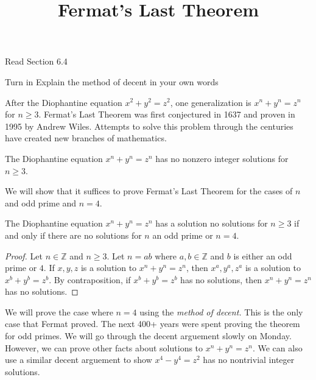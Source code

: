 \documentclass{ximera}
\title{Fermat's Last Theorem}
\begin{document}
\begin{abstract}
\end{abstract}
\maketitle

\begin{pre}
    \item[Read] Section 6.4

	\item[Turn in] Explain the method of decent in your own words
\end{pre}


After the Diophantine equation $x^2+y^2=z^2$, one generalization is $x^n+y^n=z^n$ for $n\geq 3$. Fermat's Last Theorem was first conjectured in 1637 and proven in 1995 by Andrew Wiles. Attempts to solve this problem through the centuries have created new branches of mathematics.
 
\begin{theorem}\label{fermat-last}
The Diophantine equation $x^n+y^n=z^n$ has no nonzero integer solutions for $n\geq3$.
\end{theorem}
 
We will show that it suffices to prove Fermat's Last Theorem for the cases of $n$ and odd prime and $n=4$.
\begin{theorem}\label{thm:reduce-sol-fermat}
	The Diophantine equation $x^n+y^n=z^n$ has a solution no solutions for $n\geq 3$ if and only if there are no solutions for $n$ an odd prime or $n=4$.

\begin{proof}
 	Let $n\in\mathbb{Z}$ and $n\geq 3$. Let $n=ab$ where $a,b\in\mathbb{Z}$ and $b$ is either an odd prime or $4$. If $x,y,z$ is a solution to $x^n+y^n=z^n$, then $x^a,y^a,z^a$ is a solution to $x^b+y^b=z^b$. By contraposition, if $x^b+y^b=z^b$ has no solutions, then $x^n+y^n=z^n$ has no solutions.
\end{proof}
\end{theorem}




We will prove the case where $n=4$ using the \emph{method of decent.} This is the only case that Fermat proved. The next 400+ years were spent proving the theorem for odd primes. We will go through the decent arguement slowly on Monday. However, we can prove other facts about solutions to $x^n+y^n=z^n.$ We can also use a similar decent arguement to show $x^4-y^4=z^2$ has no nontrivial integer solutions.
\end{document}
